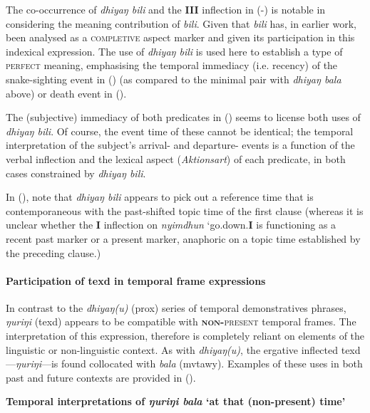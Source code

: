 \xe


The co-occurrence of \textit{dhiyaŋ bili} and the \textbf{III} inflection in (-) is notable in considering the meaning contribution of \textit{bili}. Given that \textit{bili} has, in earlier work, been analysed as a \textsc{completive} aspect marker and given its participation in this indexical expression. The use of \textit{dhiyaŋ bili} is used here to establish a type of \textsc{perfect} meaning, emphasising the temporal immediacy (i.e. recency) of the snake-sighting event in () (as compared to the minimal pair with \textit{dhiyaŋ bala} above) or death event in ().

The (subjective) immediacy of both predicates in () seems to license both uses of \textit{dhiyaŋ bili}. Of course, the event time of these cannot be identical; the temporal interpretation of the subject's arrival- and departure- events is a function of the verbal inflection and the lexical aspect (\textit{Aktions\-art}) of each predicate, in both cases constrained by \textit{dhiyaŋ bili}.

In (), note that \textit{dhiyaŋ bili} appears to pick out a reference time that is contemporaneous with the past-shifted topic time of the first clause (whereas it is unclear whether the \textbf{I} inflection on \textit{nyimdhun} `go.down.\textbf{I} is functioning as a recent past marker or a present marker, anaphoric on a topic time established by the preceding clause.) 

\paragraph{Participation of \gls{texd} in temporal frame expressions}

In contrast to the  \textit{dhiyaŋ(u)} (\gls{prox}) series of temporal demonstratives phrases, \textit{ŋuriŋi} (\gls{texd}) appears to be compatible with \textsc{\textbf{non-}present} temporal frames. The interpretation of this expression, therefore is completely reliant on elements of the linguistic or non-linguistic context. As with \textit{dhiyaŋ(u)}, the ergative inflected \gls{texd}---\textit{ŋuriŋi}---is found collocated with \textit{bala} (\gls{mvtawy}). Examples of these uses in both past and future contexts are provided in (\nextx).


\pex{}\textbf{Temporal interpretations of \textit{ŋuriŋi bala} `at that (non-present) time'}


